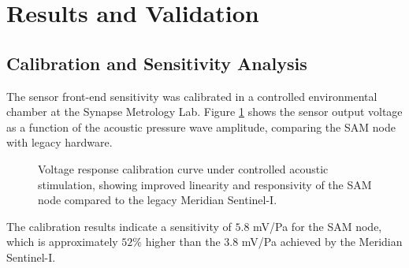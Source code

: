 \section{Results and Validation}
\label{sec:results}

\subsection{Calibration and Sensitivity Analysis}
The sensor front-end sensitivity was calibrated in a controlled environmental chamber at the Synapse Metrology Lab. Figure \ref{fig:calibration} shows the sensor output voltage as a function of the acoustic pressure wave amplitude, comparing the SAM node with legacy hardware.

\begin{figure}[htbp]
\centering
{}
\caption{Voltage response calibration curve under controlled acoustic stimulation, showing improved linearity and responsivity of the SAM node compared to the legacy Meridian Sentinel-I.}
\label{fig:calibration}
\end{figure}

The calibration results indicate a sensitivity of $5.8$ mV/Pa for the SAM node, which is approximately $52\%$ higher than the $3.8$ mV/Pa achieved by the Meridian Sentinel-I.

